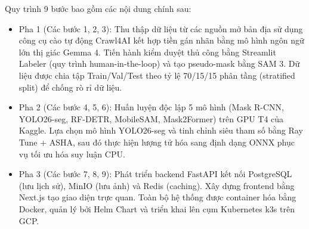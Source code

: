Quy trình 9 bước bao gồm các nội dung chính sau:
\begin{itemize}
  \item Pha 1 (Các bước 1, 2, 3): Thu thập dữ liệu từ các nguồn mở bản địa sử dụng công cụ cào tự động Crawl4AI kết hợp tiền gán nhãn bằng mô hình ngôn ngữ lớn thị giác Gemma 4. Tiến hành kiểm duyệt thủ công bằng Streamlit Labeler (quy trình human-in-the-loop) và tạo pseudo-mask bằng SAM 3. Dữ liệu được chia tập Train/Val/Test theo tỷ lệ 70/15/15 phân tầng (stratified split) để chống rò rỉ dữ liệu.
  \item Pha 2 (Các bước 4, 5, 6): Huấn luyện độc lập 5 mô hình (Mask R-CNN, YOLO26-seg, RF-DETR, MobileSAM, Mask2Former) trên GPU T4 của Kaggle. Lựa chọn mô hình YOLO26-seg và tinh chỉnh siêu tham số bằng Ray Tune + ASHA, sau đó thực hiện lượng tử hóa sang định dạng ONNX phục vụ tối ưu hóa suy luận CPU.
  \item Pha 3 (Các bước 7, 8, 9): Phát triển backend FastAPI kết nối PostgreSQL (lưu lịch sử), MinIO (lưu ảnh) và Redis (caching). Xây dựng frontend bằng Next.js tạo giao diện trực quan. Toàn bộ hệ thống được container hóa bằng Docker, quản lý bởi Helm Chart và triển khai lên cụm Kubernetes k3s trên GCP.
\end{itemize}
